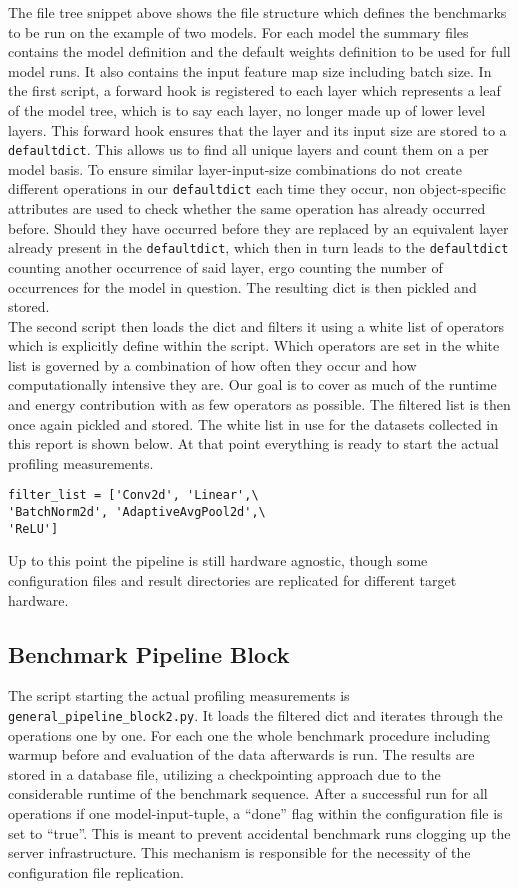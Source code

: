 \documentclass[conference]{IEEEtran}
\begin{document}
The file tree snippet above shows the file structure which defines the benchmarks to be run on the example of two models. For each model the summary files contains the model definition and the default weights definition to be used for full model runs. It also contains the input feature map size including batch size.
In the first script, a forward hook is registered to each layer which represents a leaf of the model tree, which is to say each layer, no longer made up of lower level layers. This forward hook ensures that the layer and its input size are stored to a \texttt{defaultdict}. This allows us to find all unique layers and count them on a per model basis. To ensure similar layer-input-size combinations do not create different operations in our \texttt{defaultdict} each time they occur, non object-specific attributes are used to check whether the same operation has already occurred before. Should they have occurred before they are replaced by an equivalent layer already present in the \texttt{defaultdict}, which then in turn leads to the \texttt{defaultdict} counting another occurrence of said layer, ergo counting the number of occurrences for the model in question. The resulting dict is then pickled and stored. \\
The second script then loads the dict and filters it using a white list of operators which is explicitly define within the script. Which operators are set in the white list is governed by a combination of how often they occur and how computationally intensive they are. Our goal is to cover as much of the runtime and energy contribution with as few operators as possible. The filtered list is then once again pickled and stored. The white list in use for the datasets collected in this report is shown below. At that point everything is ready to start the actual profiling measurements.
\begin{verbatim}
filter_list = ['Conv2d', 'Linear',\
'BatchNorm2d', 'AdaptiveAvgPool2d',\
'ReLU']
\end{verbatim}
Up to this point the pipeline is still hardware agnostic, though some configuration files and result directories are replicated for different target hardware.

\subsection{Benchmark Pipeline Block}
The script starting the actual profiling measurements is \texttt{general\_pipeline\_block2.py}. It loads the filtered dict and iterates through the operations one by one. For each one the whole benchmark procedure including warmup before and evaluation of the data afterwards is run. The results are stored in a database file, utilizing a checkpointing approach due to the considerable runtime of the benchmark sequence. After a successful run for all operations if one model-input-tuple, a “done” flag within the configuration file is set to “true”. This is meant to prevent accidental benchmark runs clogging up the server infrastructure. This mechanism is responsible for the necessity of the configuration file replication. \\
\end{document}
